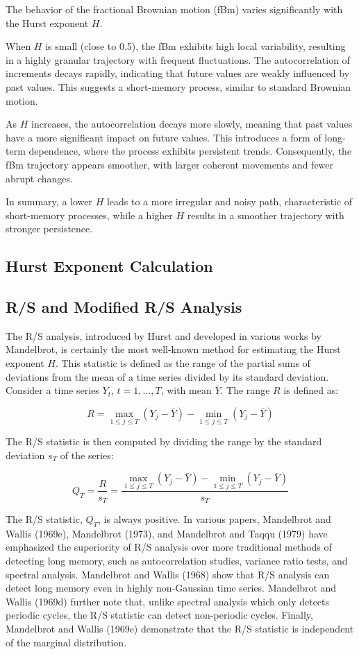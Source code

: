 \documentclass[11pt]{extarticle}
\begin{document}
\FloatBarrier

The behavior of the fractional Brownian motion (fBm) varies significantly with the Hurst exponent \( H \).

When \( H \) is small (close to 0.5), the fBm exhibits high local variability, resulting in a highly granular trajectory with frequent fluctuations. The autocorrelation of increments decays rapidly, indicating that future values are weakly influenced by past values. This suggests a short-memory process, similar to standard Brownian motion.

As \( H \) increases, the autocorrelation decays more slowly, meaning that past values have a more significant impact on future values. This introduces a form of long-term dependence, where the process exhibits persistent trends. Consequently, the fBm trajectory appears smoother, with larger coherent movements and fewer abrupt changes.

In summary, a lower \( H \) leads to a more irregular and noisy path, characteristic of short-memory processes, while a higher \( H \) results in a smoother trajectory with stronger persistence.

\subsection{Hurst Exponent Calculation}
\subsection{R/S and Modified R/S Analysis}
The R/S analysis, introduced by Hurst and developed in various works by Mandelbrot, is certainly the most well-known method for estimating the Hurst exponent $H$. This statistic is defined as the range of the partial sums of deviations from the mean of a time series divided by its standard deviation. Consider a time series $Y_t$, $t = 1, ..., T$, with mean $\bar{Y}$. The range $R$ is defined as:

\[
R = \max_{1 \leq j \leq T} \left( Y_j - \bar{Y} \right) - \min_{1 \leq j \leq T} \left( Y_j - \bar{Y} \right)
\]

The R/S statistic is then computed by dividing the range by the standard deviation $s_T$ of the series:

\[
Q_T = \frac{R}{s_T} = \frac{\max_{1 \leq j \leq T} \left( Y_j - \bar{Y} \right) - \min_{1 \leq j \leq T} \left( Y_j - \bar{Y} \right)}{s_T}
\]

The R/S statistic, $Q_T$, is always positive. In various papers, Mandelbrot and Wallis (1969e), Mandelbrot (1973), and Mandelbrot and Taqqu (1979) have emphasized the superiority of R/S analysis over more traditional methods of detecting long memory, such as autocorrelation studies, variance ratio tests, and spectral analysis. Mandelbrot and Wallis (1968) show that R/S analysis can detect long memory even in highly non-Gaussian time series. Mandelbrot and Wallis (1969d) further note that, unlike spectral analysis which only detects periodic cycles, the R/S statistic can detect non-periodic cycles. Finally, Mandelbrot and Wallis (1969e) demonstrate that the R/S statistic is independent of the marginal distribution.
\end{document}
